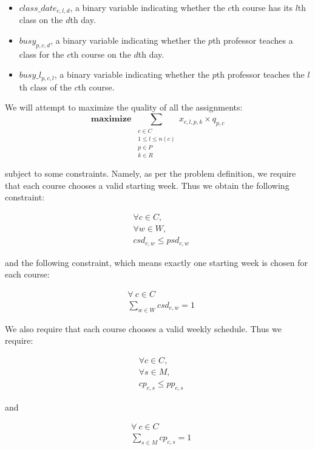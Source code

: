 \begin{itemize}
\item $class\_date_{c, l, d}$, a binary variable indicating whether the $c$th course has its $l$th class on the $d$th day.
\item $busy_{p, c, d}$, a binary variable indicating whether the $p$th professor teaches a class for the $c$th course on the $d$th day.
\item $busy\_l_{p, c, l}$, a binary variable indicating whether the $p$th professor teaches the $l$th class of the $c$th course.
\end{itemize}

We will attempt to maximize the quality of all the assignments:
$$
\textbf{maximize } \sum_{\substack{c \in C\\1 \le l \le n(c)\\p \in P\\k \in R}} x_{c, l, p, k} \times q_{p, c}
$$

subject to some constraints. Namely, as per the problem definition, we require that each course chooses a valid starting week. Thus we obtain the following constraint:

\begin{align}
  &\forall c \in C,\\
  &\forall w \in W,\\
  &csd_{c, w} \le psd_{c, w}
\end{align}

and the following constraint, which means exactly one starting week is chosen for each course:

\begin{align} \label{eq:chosenstart}
  &\forall\ c \in C\\
  &\sum_{w \in W} csd_{c, w} = 1
\end{align}

We also require that each course chooses a valid weekly schedule. Thus we require:

\begin{align}
  &\forall c \in C,\\
  &\forall s \in M,\\
  &cp_{c, s} \le pp_{c, s}
\end{align}

and

\begin{align} \label{eq:chosenpattern}
  &\forall\ c \in C\\
  &\sum_{s \in M} cp_{c, s} = 1
\end{align}

